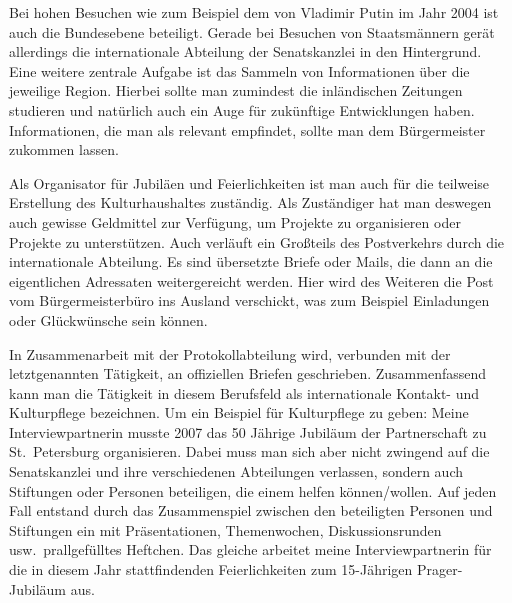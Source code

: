 \documentclass[12pt,headsepline,a4paper]{scrartcl}
\begin{document}
Bei hohen Besuchen wie zum Beispiel dem von Vladimir Putin im Jahr 2004 ist auch die Bundesebene beteiligt. Gerade bei Besuchen von Staatsmännern gerät allerdings  die internationale  Abteilung der Senatskanzlei in den Hintergrund.
Eine weitere zentrale Aufgabe ist das Sammeln von Informationen über die jeweilige Region. Hierbei sollte man zumindest die inländischen Zeitungen studieren und natürlich auch ein Auge für zukünftige Entwicklungen haben. Informationen, die man als relevant empfindet, sollte man dem Bürgermeister zukommen lassen.

Als Organisator für Jubiläen und Feierlichkeiten ist man auch für die teilweise Erstellung des Kulturhaushaltes zuständig. Als Zuständiger hat man deswegen auch gewisse Geldmittel zur Verfügung, um Projekte zu organisieren oder Projekte zu unterstützen.
Auch verläuft ein Großteils des Postverkehrs durch die internationale Abteilung. Es sind übersetzte Briefe oder Mails, die dann an die eigentlichen Adressaten weitergereicht werden. Hier wird des Weiteren die Post vom Bürgermeisterbüro ins Ausland verschickt, was zum Beispiel Einladungen oder Glückwünsche sein können.

In Zusammenarbeit mit der Protokollabteilung wird, verbunden mit der letztgenannten Tätigkeit, an offiziellen Briefen geschrieben.
Zusammenfassend kann man die Tätigkeit in diesem Berufsfeld als internationale Kontakt- und Kulturpflege bezeichnen.
Um ein Beispiel für Kulturpflege zu geben: Meine Interviewpartnerin musste  2007 das 50 Jährige Jubiläum der Partnerschaft zu St.\ Petersburg organisieren. Dabei muss man sich aber nicht zwingend auf die Senatskanzlei und ihre verschiedenen Abteilungen verlassen, sondern auch Stiftungen oder Personen beteiligen, die einem helfen können/wollen. Auf jeden Fall entstand durch das Zusammenspiel zwischen den beteiligten Personen und Stiftungen ein mit Präsentationen, Themenwochen, Diskussionsrunden usw.\  prallgefülltes Heftchen.
Das gleiche arbeitet meine Interviewpartnerin für die in diesem Jahr stattfindenden Feierlichkeiten zum 15-Jährigen Prager-Jubiläum aus.
\end{document}
